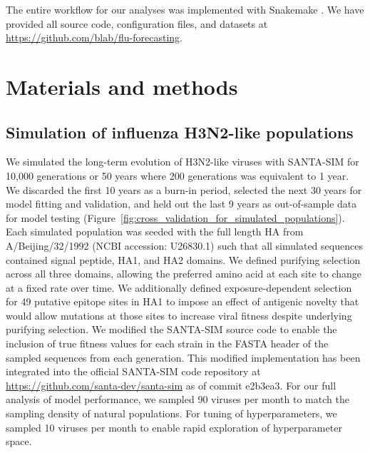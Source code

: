 The entire workflow for our analyses was implemented with Snakemake \citep{Snakemake}.
We have provided all source code, configuration files, and datasets at \href{https://github.com/blab/flu-forecasting}{https://github.com/blab/flu-forecasting}.

\section{Materials and methods}

\subsection{Simulation of influenza H3N2-like populations}

We simulated the long-term evolution of H3N2-like viruses with SANTA-SIM \citep{Jariani2019} for 10,000 generations or 50 years where 200 generations was equivalent to 1 year.
We discarded the first 10 years as a burn-in period, selected the next 30 years for model fitting and validation, and held out the last 9 years as out-of-sample data for model testing (Figure~\ref{fig:cross_validation_for_simulated_populations}).
Each simulated population was seeded with the full length HA from A/Beijing/32/1992 (NCBI accession: U26830.1) such that all simulated sequences contained signal peptide, HA1, and HA2 domains.
We defined purifying selection across all three domains, allowing the preferred amino acid at each site to change at a fixed rate over time.
We additionally defined exposure-dependent selection for 49 putative epitope sites in HA1 \citep{Luksza:2014hj} to impose an effect of antigenic novelty that would allow mutations at those sites to increase viral fitness despite underlying purifying selection.
We modified the SANTA-SIM source code to enable the inclusion of true fitness values for each strain in the FASTA header of the sampled sequences from each generation.
This modified implementation has been integrated into the official SANTA-SIM code repository at \url{https://github.com/santa-dev/santa-sim} as of commit e2b3ea3.
For our full analysis of model performance, we sampled 90 viruses per month to match the sampling density of natural populations.
For tuning of hyperparameters, we sampled 10 viruses per month to enable rapid exploration of hyperparameter space.

